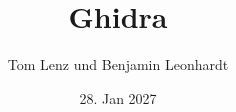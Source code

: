 \documentclass[oneside]{ausarbeitung}
\begin{document}


\Projektbericht

\IN

\title{Ghidra}

\author{Tom Lenz und Benjamin Leonhardt}

\examinerIsAProfessortrue   %


\date{28. Jan 2027}



\maketitle
\cleardoublepage

\setcounter{page}{1}


\makeaffirmation
\cleardoublepage

\makeconfidentialclause
\cleardoublepage
\end{document}
